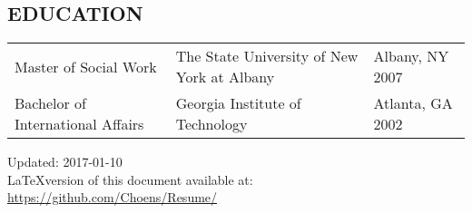 \documentclass[line, margin, 10pt]{res}
\begin{document}
\begin{resume}
  \section{EDUCATION}
  \begin{tabular} {p{1.5in} p{2.125in} p{.75in}}
    Master of Social Work & The State University of New  York at Albany & Albany, NY 2007 \\
    Bachelor of International Affairs & Georgia Institute of
    Technology & Atlanta, GA 2002
  \end{tabular}

  \vspace{.25in}
  Updated: 2017-01-10 \\
  \LaTeX version of this document available at:
  \href{https://github.com/Choens/Resume/}{https://github.com/Choens/Resume/}

  \vspace{.125in}

\end{resume}
\end{document}
